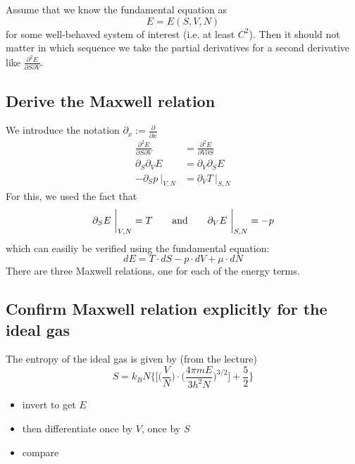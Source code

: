 Assume that we know the fundamental equation as 
\begin{equation}
    E=E(S,V,N) 
\end{equation}
for some well-behaved system of interest (i.e. at least $C^2$). Then it should 
not matter in which sequence we take the partial derivatives for a second 
derivative like $\frac{\partial^2 E}{\partial S\partial V}$.

\subsection{Derive the Maxwell relation}
    We introduce the notation $\partial_x:=\frac{\partial}{\partial x}$
    \begin{align}
        \frac{\partial^2 E}{\partial S\partial V}
        &=\frac{\partial^2 E}{\partial V\partial S} \\
        \partial_S\partial_V E &=\partial_V\partial_S E \\
        -\partial_S p\ \bigg|_{V,N} &= \partial_V T\ \bigg|_{S,N} 
    \end{align}
    For this, we used the fact that
    \begin{equation}
        \partial_S E\ \bigg|_{V,N}=T
        \ \ \ \ \ \ \textnormal{and}\ \ \ \ \ \
        \partial_V E\ \bigg|_{S,N}=-p
    \end{equation}
    which can easiliy be verified using the fundamental equation:
    \begin{equation}
        dE=T\cdot dS-p\cdot dV+\mu\cdot dN
    \end{equation}
    There are three Maxwell relations, one for each of the energy terms.

\subsection{Confirm Maxwell relation explicitly for the ideal gas}
    The entropy of the ideal gas is given by (from the lecture)
    \begin{equation}
        S=k_BN\bigg\{\bigg[\bigg(\frac{V}{N}\bigg)\cdot
        \bigg(\frac{4\pi mE}{3h^2N}\bigg)^{3/2}\bigg]+\frac{5}{2}\bigg\}
    \end{equation}
    \begin{itemize}
        \item invert to get $E$
        \item then differentiate once by $V$, once by $S$
        \item compare
    \end{itemize}
